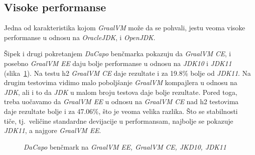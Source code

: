 \documentclass[a4paper]{article}
\begin{document}
\subsection{Visoke performanse}
\label{sub:perf}

Jedna od karakteristika kojom \emph{GraalVM} može da se pohvali, jestu veoma visoke performanse u odnosu na \emph{OracleJDK}, i \emph{OpenJDK}. 

Šipek i drugi \cite{vsipek19} pokretanjem \emph{DaCapo} benčmarka \cite{dacapo} pokazuju da \emph{GraalVM CE}, i posebno \emph{GraalVM EE} daju bolje performanse u odnosu na \emph{JDK10} i \emph{JDK11} (slika~\ref{fig:dacapo}). Na testu h2 \emph{GraalVM CE} daje rezultate i za 19.8\% bolje od \emph{JDK11}. Na drugim testovima vidimo malo poboljšanje \emph{GraalVM} kompajlera u odnosu na \emph{JDK}, ali i to da \emph{JDK} u malom broju testova daje bolje rezultate. Pored toga, treba uočavamo da \emph{GraalVM EE} u odnosu na \emph{GraalVM CE} nad h2 testovima daje rezultate bolje i za 47.06\%, što je veoma velika razlika. Što se stabilnosti tiče, tj.\ veličine standardne devijacije u performansam, najbolje se pokazuje \emph{JDK11}, a najgore \emph{GraalVM EE}.

\begin{figure}
\begin{center}
\end{center}
    \caption{\emph{DaCapo} benčmark na \emph{GraalVM EE, GraalVM CE, JKD10, JDK11}}
\label{fig:dacapo}
\end{figure}
\end{document}
